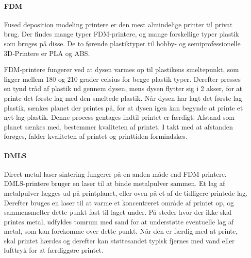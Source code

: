 \paragraph{FDM} %


Fused deposition modeling printere er den mest almindelige printer til privat brug. Der findes mange typer FDM-printere, og mange forskellige typer plastik som bruges på disse. De to førende plastiktyper til hobby- og semiprofessionelle 3D-Printere er PLA og ABS.\autocite{_3d-guide:_????} 

FDM-printere fungerer ved at dysen varmes op til plastikens smeltepunkt, som ligger mellem 180 og 210 grader celsius for begge plastik typer. Derefter presses en tynd tråd af plastik ud gennem dysen, mens dysen flytter sig i 2 akser, for at printe det første lag med den smeltede plastik. 
Når dysen har lagt det første lag plastik, sænkes planet der printes på, for at dysen igen kan begynde at printe et nyt lag plastik. Denne process gentages indtil printet er færdigt. 
Afstand som planet sænkes med, bestemmer kvaliteten af printet. I takt med at afstanden forøges, falder kvaliteten af printet og printtiden formindskes.


\paragraph{DMLS} %


Direct metal laser sintering fungerer på en anden måde end FDM-printere. DMLS-printere bruger en laser til at binde metalpulver sammen. Et lag af metalpulver lægges ud på printplanet, eller oven på et af de tidligere printede lag. Derefter bruges en laser til at varme et koncentreret område af printet op, og sammensmelter dette punkt fast til laget under. På steder hvor der ikke skal printes metal, udfyldes tomrum med sand for at understøtte eventuelle lag af metal, som kan forekomme over dette punkt.\autocite{manyika_disruptive_2013}
Når den er færdig med at printe, skal printet hærdes og derefter kan støttesandet typisk fjernes med vand eller lufttryk for at færdiggøre printet\autocite{manyika_disruptive_2013}.
\newpage



